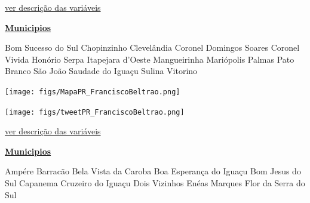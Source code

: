 \documentclass[10pt]{article} %
\begin{document}
\begin{minipage}[t]{.66\linewidth}
\begin{center}

\end{center}
\small{\hyperlink{vartab}{ver descrição das variáveis}}\end{minipage}\hfill\begin{minipage}[t]{.30\linewidth}
\begin{mdframed}[style=sidebar,frametitle={}]
\textbf{\hyperlink{municips}{Municipios}}\begin{itemize}\gsquare Bom Sucesso do Sul 
\gsquare Chopinzinho 
\gsquare Clevelândia 
\gsquare Coronel Domingos Soares 
\gsquare Coronel Vivida 
\gsquare Honório Serpa 
\gsquare Itapejara d'Oeste 
\gsquare Mangueirinha 
\gsquare Mariópolis 
\gsquare Palmas 
\gsquare Pato Branco 
\gsquare São João 
\gsquare Saudade do Iguaçu 
\gsquare Sulina 
\gsquare Vitorino 
\end{itemize}\BackToContents\end{mdframed}\hfill\end{minipage}\newpage\begin{minipage}[t]{.66\linewidth}
\hypertarget{FrnB}{}
\texttt{[image: figs/MapaPR\_FranciscoBeltrao.png]}\vspace{0.5cm}\vspace{0.5cm}\begin{center}
\texttt{[image: figs/tweetPR\_FranciscoBeltrao.png]}\end{center}
\begin{center}

\end{center}
\small{\hyperlink{vartab}{ver descrição das variáveis}}\end{minipage}\hfill\begin{minipage}[t]{.30\linewidth}
\begin{mdframed}[style=sidebar,frametitle={}]
\textbf{\hyperlink{municips}{Municipios}}\begin{itemize}\gsquare Ampére 
\gsquare Barracão 
\gsquare Bela Vista da Caroba 
\gsquare Boa Esperança do Iguaçu 
\gsquare Bom Jesus do Sul 
\gsquare Capanema 
\gsquare Cruzeiro do Iguaçu 
\gsquare Dois Vizinhos 
\gsquare Enéas Marques 
\gsquare Flor da Serra do Sul 

\end{itemize}
\end{mdframed}
\end{minipage}
\end{document}
